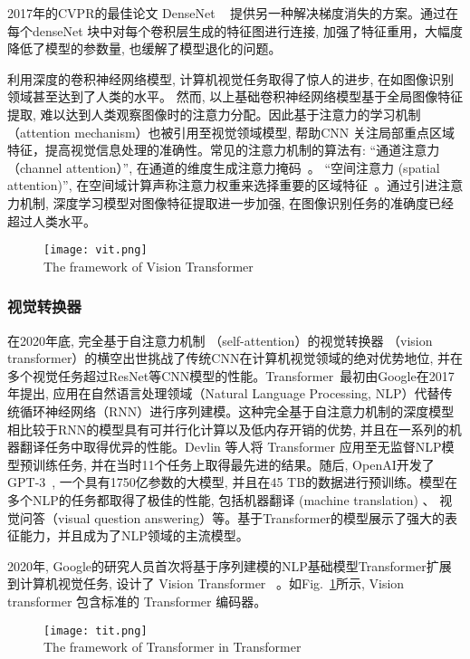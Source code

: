 2017年的CVPR的最佳论文 DenseNet ~\cite{huang2017densely} 提供另一种解决梯度消失的方案。通过在每个denseNet 块中对每个卷积层生成的特征图进行连接, 加强了特征重用，大幅度降低了模型的参数量, 也缓解了模型退化的问题。 \par
利用深度的卷积神经网络模型, 计算机视觉任务取得了惊人的进步, 在如图像识别领域甚至达到了人类的水平。 然而, 以上基础卷积神经网络模型基于全局图像特征提取, 难以达到人类观察图像时的注意力分配。因此基于注意力的学习机制 （attention mechanism）也被引用至视觉领域模型, 帮助CNN 关注局部重点区域特征，提高视觉信息处理的准确性。常见的注意力机制的算法有: ``通道注意力（channel attention）'', 在通道的维度生成注意力掩码~\cite{hu2018squeeze,liu2022spatial, zhang2018context,gao2019global,yang2020gated, chen2019you}。 ``空间注意力 (spatial attention)'', 在空间域计算声称注意力权重来选择重要的区域特征~\cite{wang2018non,gregor2015draw,mnih2014recurrent, jaderberg2015spatial}。通过引进注意力机制, 深度学习模型对图像特征提取进一步加强, 在图像识别任务的准确度已经超过人类水平。
\begin{figure}[!htp]
    \centering
    \texttt{[image: vit.png]} \\
      {The framework of Vision Transformer}
   \label{fig:vit}
  \end{figure}

\subsubsection{视觉转换器}
在2020年底, 完全基于自注意力机制 （self-attention）的视觉转换器 （vision transformer）的横空出世挑战了传统CNN在计算机视觉领域的绝对优势地位, 并在多个视觉任务超过ResNet等CNN模型的性能。Transformer~\cite{vaswani2017attention}最初由Google在2017年提出, 应用在自然语言处理领域（Natural Language Processing, NLP）代替传统循环神经网络（RNN）进行序列建模。这种完全基于自注意力机制的深度模型相比较于RNN的模型具有可并行化计算以及低内存开销的优势, 并且在一系列的机器翻译任务中取得优异的性能。Devlin 等人将 Transformer \cite{devlin2018bert} 应用至无监督NLP模型预训练任务, 并在当时11个任务上取得最先进的结果。随后, OpenAI开发了GPT-3~\cite{brown2020language}, 一个具有1750亿参数的大模型, 并且在45 TB的数据进行预训练。模型在多个NLP的任务都取得了极佳的性能, 包括机器翻译 (machine translation) 、 视觉问答（visual question answering）等。基于Transformer的模型展示了强大的表征能力，并且成为了NLP领域的主流模型。\par

2020年, Google的研究人员首次将基于序列建模的NLP基础模型Transformer扩展到计算机视觉任务, 设计了 Vision Transformer~\cite{dosovitskiy2020image} 。如Fig.~\ref{fig:vit}所示, Vision transformer 包含标准的 Transformer 编码器。
\begin{figure}[!htp]
    \centering
    \texttt{[image: tit.png]} \\
      {The framework of  Transformer in Transformer}
   \label{fig:tit}
  \end{figure}

